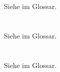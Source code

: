 Siehe  im Glossar.


\section[Prädikatenlogik]{\Praedikatenlogik}%
\beginsection            {\Praedikatenlogik}
\label                {sec:Praedikatenlogik}


Siehe  im Glossar.


\section[Mengenlehre]{\Mengenlehre}%
\beginsection        {\Mengenlehre}
\label            {sec:Mengenlehre}


Siehe  im Glossar.


\Endchapter
